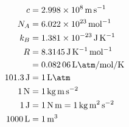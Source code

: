 \begin{align*}
c&= \SI{2.998e8}{\meter\per\second}\\
N_A&= \SI{6.022e23}{\per\mole}\\
k_B&= \SI{1.381e-23}{\joule\per\kelvin}\\
R&= \SI{8.3145}{\joule\per\kelvin\per\mole}\\
&= \SI{0.08206}{\liter\atm\per\mole\per\kelvin}\\
\SI{101.3}{\joule}&=\SI{1}{\liter\atm}\\
\SI{1}{\newton} &= \SI{1}{\kilo\gram\meter\per\second\squared}\\
\SI{1}{\joule}&= \SI{1}{\newton\meter} = \SI{1}{\kilo\gram\meter\squared\per\second\squared}\\
\SI{1000}{\liter} &= \SI{1}{\meter\cubed}\\
\end{align*}
